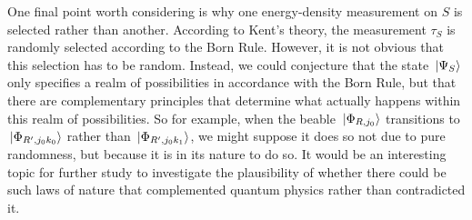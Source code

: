 One final point worth considering is why one energy-density measurement on $S$ is selected rather than another. According to Kent's theory, the measurement $\tau_S$ is randomly selected according to the Born Rule. However, it is not obvious that this selection has to be random. Instead, we could conjecture that the state $\ket*{\Psi_S}$ only specifies a realm of possibilities in accordance with the Born Rule, but that there are complementary principles that determine what actually happens within this realm of possibilities. So for example, when the beable $\ket*{\Phi_{R,j_0}}$ transitions to $\ket*{\Phi_{R', j_0k_0}}$ rather than $\ket*{\Phi_{R', j_0k_1}}$, we might suppose it does so not due to pure randomness, but because it is in its nature to do so. It would be an interesting topic for further study to investigate the plausibility of whether there could be such laws of nature that complemented quantum physics rather than contradicted it.


